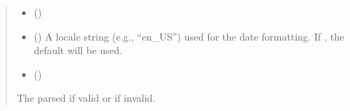 \documentclass[letterpaper,10pt,english]{sphinxmanual}
\begin{document}
\begin{fulllineitems}
\begin{fulllineitems}
\begin{quote}
\begin{description}
\begin{itemize}
\item {} 
\sphinxAtStartPar
{} ()

\item {} 
\sphinxAtStartPar
{} () \textendash{} A locale string (e.g., “en\_US”) used for the date formatting.
If , the default will be used.

\item {} 
\sphinxAtStartPar
{} ()

\end{itemize}

\sphinxAtStartPar
The parsed  if valid or  if invalid.

\end{description}\end{quote}

\end{fulllineitems}


\end{fulllineitems}
\end{document}
